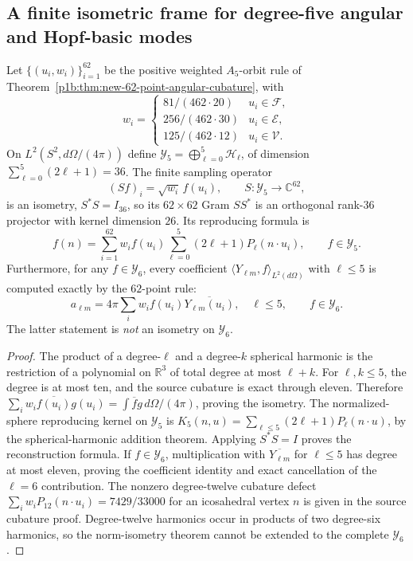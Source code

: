\documentclass[11pt]{article}
\begin{document}
\subsection{A finite isometric frame for degree-five angular and Hopf-basic modes}
\label{p1b:sec:cc13-band-frame}

\begin{theorem}
\label{p1b:thm:cc13-band-frame}
Let $\{(u_i,w_i)\}_{i=1}^{62}$ be the positive weighted
$A_5$-orbit rule of
Theorem~\ref{p1b:thm:new-62-point-angular-cubature}, with
\[
 w_i=\begin{cases}
 81/(462\cdot20)&u_i\in\mathcal F,\\
 256/(462\cdot30)&u_i\in\mathcal E,\\
 125/(462\cdot12)&u_i\in\mathcal V.
 \end{cases}
\]
On $L^2(S^2,d\Omega/(4\pi))$ define
$\mathscr Y_5=\bigoplus_{\ell=0}^5\mathscr H_\ell$, of dimension
$\sum_{\ell=0}^5(2\ell+1)=36$.  The finite sampling operator
\[
 (Sf)_i=\sqrt{w_i}\,f(u_i),\qquad S:\mathscr Y_5\to\mathbb C^{62},
\]
is an isometry, $S^*S=I_{36}$, so its $62\times62$ Gram $SS^*$
is an orthogonal rank-$36$ projector with kernel dimension $26$.
Its reproducing formula is
\begin{equation}\label{p1b:eq:cc13-frame-reconstruct}
 \boxed{f(n)=\sum_{i=1}^{62}w_if(u_i)
 \sum_{\ell=0}^5(2\ell+1)P_\ell(n\cdot u_i),\qquad f\in\mathscr Y_5.}
\end{equation}
Furthermore, for any $f\in\mathscr Y_6$, every coefficient
$\langle Y_{\ell m},f\rangle_{L^2(d\Omega)}$ with $\ell\le5$ is
computed exactly by the $62$-point rule:
\[
 \boxed{a_{\ell m}=4\pi\sum_i w_i f(u_i)
 \overline{Y_{\ell m}(u_i)},\quad \ell\le5,\qquad
 f\in\mathscr Y_6.}
\]
The latter statement is \emph{not} an isometry on $\mathscr Y_6$.
\end{theorem}
\begin{proof}
The product of a degree-$\ell$ and a degree-$k$ spherical harmonic
is the restriction of a polynomial on $\mathbb R^3$ of total degree
at most $\ell+k$.  For $\ell,k\le5$, the degree is at most ten,
and the source cubature is exact through eleven.  Therefore
$\sum_iw_i\overline{f(u_i)}g(u_i)
=\int\overline f g\,d\Omega/(4\pi)$, proving the isometry.
The normalized-sphere reproducing kernel on $\mathscr Y_5$ is
$K_5(n,u)=\sum_{\ell\le5}(2\ell+1)P_\ell(n\cdot u)$, by the
spherical-harmonic addition theorem.  Applying $S^*S=I$ proves the
reconstruction formula.  If $f\in\mathscr Y_6$, multiplication with
$\overline{Y_{\ell m}}$ for $\ell\le5$ has degree at most eleven,
proving the coefficient identity and exact cancellation of the
$\ell=6$ contribution.
The nonzero degree-twelve cubature defect
$\sum_iw_iP_{12}(n\cdot u_i)=7429/33000$ for an icosahedral vertex $n$
is given in the source cubature proof.  Degree-twelve harmonics occur
in products of two degree-six harmonics, so the norm-isometry theorem
cannot be extended to the complete $\mathscr Y_6$.
\end{proof}
\end{document}
